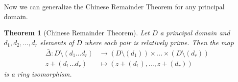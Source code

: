 \documentclass[12pt,a4paper]{article}
\newtheorem{theorem}{Theorem}[section]
\theoremstyle{definition}
\begin{document}
Now we can generalize the Chinese Remainder Theorem for any principal domain.

\begin{theorem}[Chinese Remainder Theorem]
Let $D$ a principal domain and $d_1, d_2, \ldots, d_r$ elements of $D$ where each pair is relatively prime. Then the map
\begin{equation*}
\begin{aligned}
\bar{\Delta}: D \setminus (d_1 \ldots d_r) & \to (D \setminus (d_1)) \times \ldots \times (D \setminus (d_r)) \\
z + (d_1 \ldots d_r) & \mapsto (z + (d_1), \ldots, z + (d_r))
\end{aligned}
\end{equation*}
is a ring isomorphism.
\end{theorem}




\nocite{*}


\end{document}
